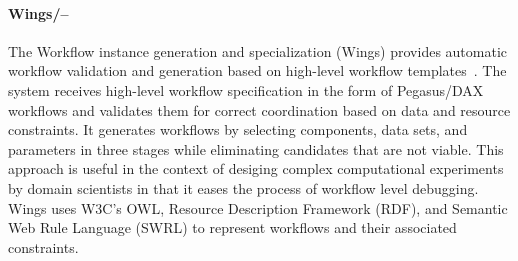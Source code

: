 \paragraph{Wings/--} The Workflow instance generation and specialization
(Wings) provides automatic workflow validation and generation based on
high-level workflow templates~\cite{wings2013}. The system receives high-level
workflow specification in the form of Pegasus/DAX workflows and validates them
for correct coordination based on data and resource constraints. It generates
workflows by selecting components, data sets, and parameters in three stages
while eliminating candidates that are not viable. This approach is useful in
the context of desiging complex computational experiments by domain scientists
in that it eases the process of workflow level debugging. Wings uses W3C's OWL,
Resource Description Framework (RDF), and Semantic Web Rule Language (SWRL) to
represent workflows and their associated constraints.


%
